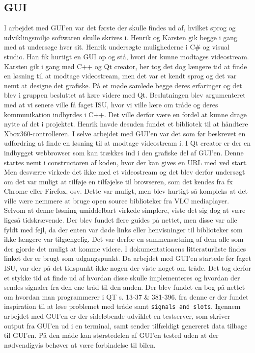 \subsection{GUI}
I arbejdet med GUI’en var det første der skulle findes ud af, hvilket sprog og udviklingsmiljø softwaren skulle skrives i. Henrik og Karsten gik begge i gang med at undersøge hver sit. Henrik undersøgte mulighederne i C\# og visual studio. Han fik hurtigt en GUI op og stå, hvori der kunne modtages videostream. Karsten gik i gang med C++ og Qt creator, her tog det dog længere tid at finde en løsning til at modtage videostream, men det var et kendt sprog og det var nemt at designe det grafiske. På et møde samlede begge deres erfaringer og det blev i gruppen besluttet at køre videre med Qt. Beslutningen blev argumenteret med at vi senere ville få faget ISU, hvor vi ville lære om tråde og deres kommunikation indbyrdes i C++. Det ville derfor være en fordel at kunne drage nytte af det i projektet. Henrik havde desuden fundet et bibliotek til at håndtere Xbox360-controlleren.
I selve arbejdet med GUI’en var det som før beskrevet en udfordring at finde en løsning til at modtage videostream i. I Qt creator er der en indbygget webbrowser som kan trækkes ind i den grafiske del af GUI’en. Denne startes nemt i constructoren af koden, hvor der kan gives en URL med ved start. Men desværre virkede det ikke med et videostream og det blev derfor undersøgt om det var muligt at tilføje en tilføjelse til browseren, som det kendes fra fx Chrome eller Firefox, osv. Dette var muligt, men blev hurtigt så kompleks at det ville være nemmere at bruge open source biblioteker fra VLC mediaplayer. Selvom at denne løsning umiddelbart virkede simplere, viste det sig dog at være ligeså tidskrævende. Der blev fundet flere guides på nettet, men disse var alle fyldt med fejl, da der enten var døde links eller henvisninger til biblioteker som ikke længere var tilgængelig. Det var derfor en sammensætning af dem alle som der gjorde det muligt at komme videre. I dokumentationens litteraturliste findes linket \cite{lib:vlc-using-qt} der er brugt som udgangspunkt. 
Da arbejdet med GUI’en startede før faget ISU, var der på det tidspunkt ikke nogen der viste noget om tråde. Det tog derfor et stykke tid at finde ud af hvordan disse skulle implementeres og hvordan der sendes signaler fra den ene tråd til den anden. Der blev fundet en bog på nettet om hvordan man programmerer i QT \cite{lib:qt-bog} s. 13-37 \& 381-396. fra denne er der fundet inspiration til at løse problemet med tråde samt \texttt{signals and slots}. Igennem arbejdet med GUI'en er der sideløbende udviklet en testserver, som skriver output fra GUI'en ud i en terminal, samt sender tilfældigt genereret data tilbage til GUI'en. På den måde kan størstedelen af GUI'en tested uden at der nødvendigvis behøver at være forbindelse til bilen. 
